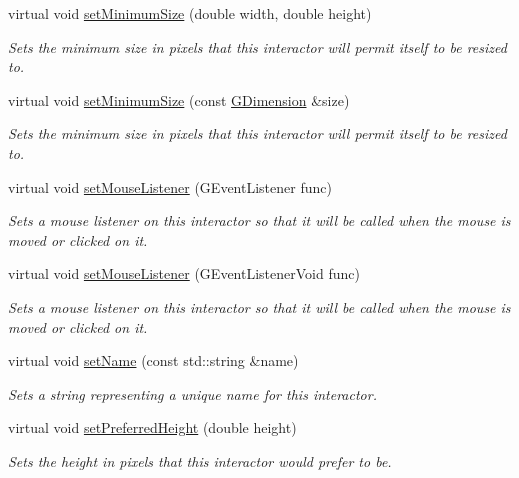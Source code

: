 \begin{DoxyCompactItemize}
virtual void \mbox{\hyperlink{classGInteractor_a0cf428e207b7f22cc08138a90b1b87b2}{set\+Minimum\+Size}} (double width, double height)
\begin{DoxyCompactList}\small\item\em Sets the minimum size in pixels that this interactor will permit itself to be resized to. \end{DoxyCompactList}\item 
virtual void \mbox{\hyperlink{classGInteractor_a3b1046117ac6cb7abe467e00ba8a81f4}{set\+Minimum\+Size}} (const \mbox{\hyperlink{structGDimension}{G\+Dimension}} \&size)
\begin{DoxyCompactList}\small\item\em Sets the minimum size in pixels that this interactor will permit itself to be resized to. \end{DoxyCompactList}\item 
virtual void \mbox{\hyperlink{classGInteractor_a37d8dbc943f59920f705b0104f60bde2}{set\+Mouse\+Listener}} (G\+Event\+Listener func)
\begin{DoxyCompactList}\small\item\em Sets a mouse listener on this interactor so that it will be called when the mouse is moved or clicked on it. \end{DoxyCompactList}\item 
virtual void \mbox{\hyperlink{classGInteractor_aea7f647ea62d59f71b5fad6aa65eeaf9}{set\+Mouse\+Listener}} (G\+Event\+Listener\+Void func)
\begin{DoxyCompactList}\small\item\em Sets a mouse listener on this interactor so that it will be called when the mouse is moved or clicked on it. \end{DoxyCompactList}\item 
virtual void \mbox{\hyperlink{classGInteractor_a9d3a2685df23b5e7cbf59c19c4a1f9b5}{set\+Name}} (const std\+::string \&name)
\begin{DoxyCompactList}\small\item\em Sets a string representing a unique name for this interactor. \end{DoxyCompactList}\item 
virtual void \mbox{\hyperlink{classGInteractor_a1ab987704fce32098706c6f00fb08218}{set\+Preferred\+Height}} (double height)
\begin{DoxyCompactList}\small\item\em Sets the height in pixels that this interactor would prefer to be. \end{DoxyCompactList}\item 

\end{DoxyCompactItemize}
